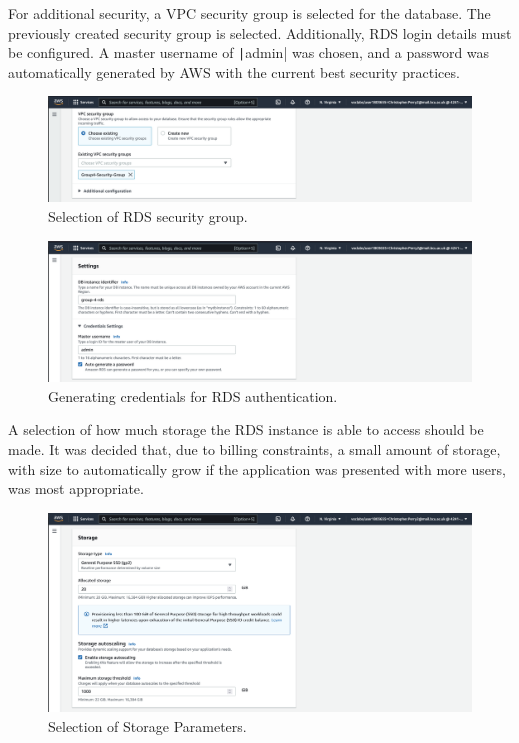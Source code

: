 \clearpage
For additional security, a VPC security group is selected for the database.
The previously created security group is selected.
Additionally, RDS login details must be configured.
A master username of \texttt|admin| was chosen, and a password was automatically generated
by AWS with the current best security practices.

\begin{figure}[!htbp]
    \centering
    \includegraphics[width=\textwidth]{resources/rds/rds-security-group}
    \caption{Selection of RDS security group.}
    \label{fig:rds-security}
\end{figure}

\begin{figure}[!htbp]
    \centering
    \includegraphics[width=\textwidth]{resources/rds/rds-settings}
    \caption{Generating credentials for RDS authentication.}
    \label{fig:rds-settings}
\end{figure}

\clearpage
A selection of how much storage the RDS instance is able to access should be made.
It was decided that, due to billing constraints, a small amount of storage, with size to automatically grow if
the application was presented with more users, was most appropriate.

\begin{figure}[!htbp]
    \centering
    \includegraphics[width=125mm]{resources/rds/rds-storage}
    \caption{Selection of Storage Parameters.}
    \label{fig:rds-storage}
\end{figure}

